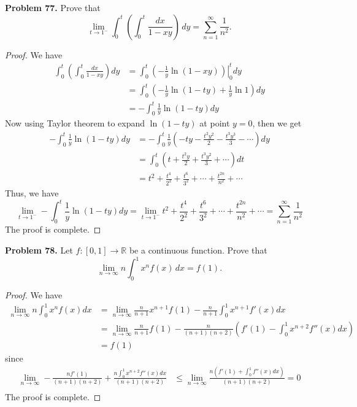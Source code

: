 \documentclass[12pt,leqno]{amsart}
\begin{document}
\medskip

\noindent
{\bf Problem 77.}
Prove that
$$
\lim_{t\to 1^-}\int_0^t\left(\int_0^t\frac{dx}{1-xy}\right)\, dy=\sum_{n=1}^\infty\frac{1}{n^2}.
$$
\begin{proof}
We have 
\begin{align*}
    \int_0^t\left(\int_0^t\frac{dx}{1-xy}\right) dy & = \int_0^t \left. \left(-\frac{1}{y}\ln (1-xy)\right)\right|^t_0 dy \\
    & = \int_0^t \left(-\frac{1}{y}\ln (1 - ty) + \frac{1}{y}\ln 1\right) dy \\
    & = - \int_0^t \frac{1}{y}\ln (1 - ty) dy
\end{align*}
Now using Taylor theorem to expand $\ln (1 - ty)$ at point $y=0$, then we get 
\begin{align*}
    - \int_0^t \frac{1}{y}\ln (1 - ty) dy & = - \int_0^t \frac{1}{y}\left(-ty - \frac{t^2y^2}{2} - \frac{t^3y^3}{3} - \cdots \right) dy \\
    & = \int_0^t \left(t + \frac{t^2y}{2} + \frac{t^3y^2}{3} + \cdots \right) dt \\
    & = t^2 + \frac{t^4}{2^2} + \frac{t^6}{3^2} + \cdots + \frac{t^{2n}}{n^2} +\cdots
\end{align*}
Thus, we have $$\lim_{t\to 1^-} - \int_0^t \frac{1}{y}\ln (1 - ty) dy = \lim_{t\to 1^-} t^2 + \frac{t^4}{2^2} + \frac{t^6}{3^2} + \cdots + \frac{t^{2n}}{n^2} +\cdots = \sum^\infty_{n=1}\frac{1}{n^2}$$ 
The proof is complete.
\end{proof}

\medskip

\noindent
{\bf Problem 78.}
Let $f:[0,1]\to\mathbb{R}$ be a continuous function. Prove that
$$
\lim_{n\to\infty} n\int_0^1 x^nf(x)\, dx=f(1).
$$
\begin{proof}
We have 
\begin{align*}
    \lim_{n\to\infty} n\int_0^1 x^nf(x) dx & = \lim_{n\to\infty} \frac{n}{n+1}x^{n+1}f(1) - \frac{n}{n+1}\int^1_0 x^{n+1}f'(x)dx \\
    & = \lim_{n\to\infty} \frac{n}{n+1}f(1) - \frac{n}{(n+1)(n+2)}\left(f'(1) - \int^1_0x^{n+2}f''(x)dx\right) \\
    & = f(1)
\end{align*}
since 
\begin{align*}
    \lim_{n\to\infty} - \frac{n f'(1)}{(n+1)(n+2)} + \frac{n\int^1_0x^{n+2}f''(x)dx}{(n+1)(n+2)} & \leq \lim_{n\to\infty} \frac{n(f'(1)+\int^1_0f''(x)dx)}{(n+1)(n+2)} = 0\\
\end{align*}
The proof is complete.
\end{proof}
\end{document}
